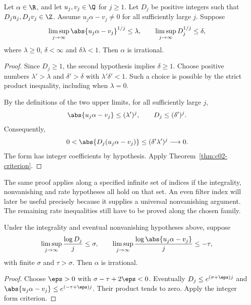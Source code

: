 \begin{theorem}
\label{thm:c02-rate}
Let $\alpha\in\R$, and let $u_j,v_j\in\Q$ for $j\geq1$. Let $D_j$ be positive integers such that $D_ju_j,D_jv_j\in\Z$. Assume $u_j\alpha-v_j\ne0$ for all sufficiently large $j$. Suppose
\begin{equation}
\limsup_{j\to\infty}\abs{u_j\alpha-v_j}^{1/j}\leq\lambda,
\qquad
\limsup_{j\to\infty}D_j^{1/j}\leq\delta,
\label{eq:c02-root-bounds}
\end{equation}
where $\lambda\geq0$, $\delta<\infty$ and $\delta\lambda<1$. Then $\alpha$ is irrational.
\end{theorem}

\begin{proof}
Since $D_j\geq1$, the second hypothesis implies $\delta\geq1$. Choose positive numbers $\lambda'>\lambda$ and $\delta'>\delta$ with $\lambda'\delta'<1$. Such a choice is possible by the strict product inequality, including when $\lambda=0$.

By the definitions of the two upper limits, for all sufficiently large $j$,
\[
\abs{u_j\alpha-v_j}\leq(\lambda')^j,
\qquad D_j\leq(\delta')^j.
\]
Consequently,
\[
0<\abs{D_j(u_j\alpha-v_j)}
\leq(\delta'\lambda')^j\longrightarrow0.
\]
The form has integer coefficients by hypothesis. Apply Theorem~\ref{thm:c02-criterion}.
\end{proof}

The same proof applies along a specified infinite set of indices if the integrality, nonvanishing and rate hypotheses all hold on that set. An even filter index will later be useful precisely because it supplies a universal nonvanishing argument. The remaining rate inequalities still have to be proved along the chosen family.

\begin{corollary}
\label{cor:c02-log-rate}
Under the integrality and eventual nonvanishing hypotheses above, suppose
\begin{equation}
\limsup_{j\to\infty}\frac{\log D_j}{j}\leq\sigma,
\qquad
\limsup_{j\to\infty}\frac{\log\abs{u_j\alpha-v_j}}{j}\leq-\tau,
\label{eq:c02-log-bounds}
\end{equation}
with finite $\sigma$ and $\tau>\sigma$. Then $\alpha$ is irrational.
\end{corollary}

\begin{proof}
Choose $\eps>0$ with $\sigma-\tau+2\eps<0$. Eventually $D_j\leq e^{(\sigma+\eps)j}$ and $\abs{u_j\alpha-v_j}\leq e^{(-\tau+\eps)j}$. Their product tends to zero. Apply the integer form criterion.
\end{proof}

